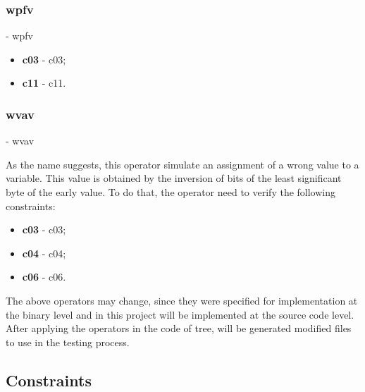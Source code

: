 	\subsubsection{\textbf{\acs{wpfv}}} - \Acl{wpfv}
	\hypertarget{wpfv}{}

	\begin{itemize}
		\item \textbf{\acs{c03}} - \Acl{c03};
		\item \textbf{\acs{c11}} - \Acl{c11}.
	\end{itemize}

	\subsubsection{\textbf{\acs{wvav}}} - \Acl{wvav}
	\hypertarget{wvav}{}

	As the name suggests, this operator simulate an assignment of a wrong value to a variable. This value is obtained by the inversion of bits of the least significant byte of the early value. To do that, the operator need to verify the following constraints:

	\begin{itemize}
		\item \textbf{\acs{c03}} - \Acl{c03};
		\item \textbf{\acs{c04}} - \Acl{c04};
		\item \textbf{\acs{c06}} - \Acl{c06}.
	\end{itemize}

The above operators may change, since they were specified for implementation at the binary level and in this project will be implemented at the source code level.
After applying the operators in the code of tree, will be generated modified files to use in the testing process.

\clearpage
\subsection{Constraints}


